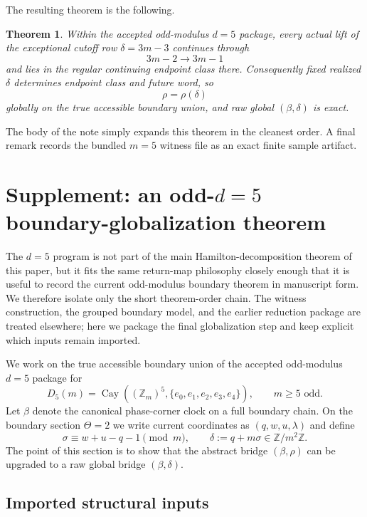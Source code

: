 \documentclass[11pt]{article}
\newtheorem{theorem}{Theorem}
\newcommand{\Zm}{\mathbb Z_m}
\begin{document}
The resulting theorem is the following.

\begin{theorem}\label{thm:intro-main}
Within the accepted odd-modulus $d=5$ package, every actual lift of the exceptional cutoff row $\delta=3m-3$ continues through
\[
3m-2\to 3m-1
\]
and lies in the regular continuing endpoint class there.
Consequently fixed realized $\delta$ determines endpoint class and future word, so
\[
\rho=\rho(\delta)
\]
globally on the true accessible boundary union, and raw global $(\beta,\delta)$ is exact.
\end{theorem}

The body of the note simply expands this theorem in the cleanest order.
A final remark records the bundled $m=5$ witness file as an exact finite sample artifact.



\section{Supplement: an odd-$d=5$ boundary-globalization theorem}\label{sec:d5}

The $d=5$ program is not part of the main Hamilton-decomposition theorem of this paper, but it fits the same return-map philosophy closely enough that it is useful to record the current odd-modulus boundary theorem in manuscript form.
We therefore isolate only the short theorem-order chain.
The witness construction, the grouped boundary model, and the earlier reduction package are treated elsewhere; here we package the final globalization step and keep explicit which inputs remain imported.

We work on the true accessible boundary union of the accepted odd-modulus $d=5$ package for
\[
D_5(m)=\operatorname{Cay}((\Zm)^5,\{e_0,e_1,e_2,e_3,e_4\}),
\qquad m\ge 5\text{ odd}.
\]
Let $\beta$ denote the canonical phase-corner clock on a full boundary chain.
On the boundary section $\Theta=2$ we write current coordinates as $(q,w,u,\lambda)$ and define
\[
\sigma \equiv w+u-q-1 \pmod m,
\qquad
\delta := q + m\sigma \in \mathbb Z/m^2\mathbb Z.
\]
The point of this section is to show that the abstract bridge $(\beta,\rho)$ can be upgraded to a raw global bridge $(\beta,\delta)$.

\subsection{Imported structural inputs}
\end{document}
